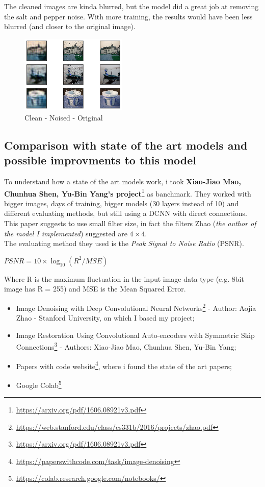 \documentclass[twocolumn,showpacs,%
  nofootinbib,aps,superscriptaddress,%
  eqsecnum,prd,notitlepage,showkeys,10pt]{revtex4-1}
\begin{document}
The cleaned images are kinda blurred, but the model did a great job at removing the salt and pepper noise. With more training, the results would have been less blurred (and closer to the original image).
\begin{figure}[H]
    \includegraphics[width=0.45\textwidth]{images/prediction.png}
    \caption{\label{fig:noise}Clean - Noised - Original}
\end{figure}

\subsection{Comparison with state of the art models and possible improvments to this model}
To understand how a state of the art models work, i took \textbf{Xiao-Jiao Mao, Chunhua Shen, Yu-Bin Yang's project}\footnote{\url{https://arxiv.org/pdf/1606.08921v3.pdf}} as banchmark. They worked with bigger images, days of training, bigger models (30 layers instead of 10) and different evaluating methods, but still using a DCNN with direct connections.\\
This paper suggests to use small filter size, in fact the filters Zhao (\textit{the author of the model I implemented}) suggested are $4\times4$. \\
The evaluating method they used is the \textit{Peak Signal to Noise Ratio} (PSNR).\\
\begin{center}
$PSNR=10\times{\log_{10} ({R^2/MSE})}$     
\end{center}
Where R is the maximum fluctuation in the input image data type (e.g. 8bit image has R = 255) and MSE is the Mean Squared Error.

\begin{acknowledgments}
    \begin{itemize}
        \item Image Denoising with Deep Convolutional Neural Networks\footnote{\url{https://web.stanford.edu/class/cs331b/2016/projects/zhao.pdf}} - Author: Aojia Zhao - Stanford University, on which I based my project;
        \item Image Restoration Using Convolutional Auto-encoders with Symmetric Skip Connections\footnote{\url{https://arxiv.org/pdf/1606.08921v3.pdf}} - Authors: Xiao-Jiao Mao, Chunhua Shen, Yu-Bin Yang;
        \item Papers with code website\footnote{\url{https://paperswithcode.com/task/image-denoising}}, where i found the state of the art papers;
        \item Google Colab\footnote{\url{https://colab.research.google.com/notebooks/}}
    \end{itemize}
\end{acknowledgments}
\end{document}
